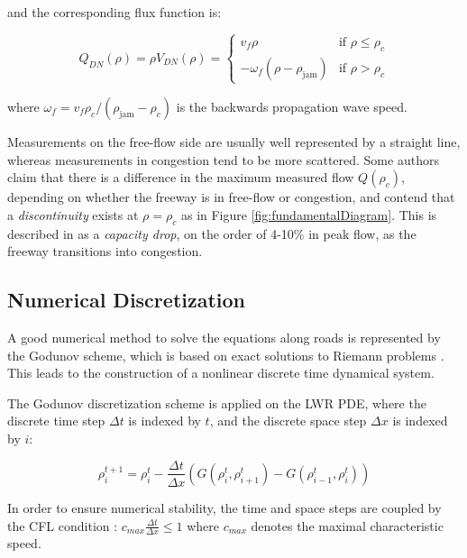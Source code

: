 \documentclass[11pt]{article}
\numberwithin{equation}{section}
\numberwithin{figure}{section}
\numberwithin{table}{section}
\begin{document}
\noindent and the corresponding flux function is:

\begin{equation}\label{eq:dnFlux}
Q_{DN}(\rho) = \rho V_{DN}(\rho) = \begin{cases}
v_{f} \rho & \text{if } \rho \leq \rho_{c} \\
-\omega_{f} \left( \rho - \rho_{\text{jam}} \right) & \text{if } \rho > \rho_{c}
\end{cases}
\end{equation}

\noindent where $\omega_{f}=v_{f}\rho_{c}/(\rho_{\text{jam}}-\rho_{c})$ is the backwards propagation wave speed.

Measurements on the free-flow side are usually well represented by a straight line, whereas measurements in congestion tend to be more scattered. Some authors claim that there is a difference in the maximum measured flow $Q(\rho_{c})$, depending on whether the freeway is in free-flow or congestion, and contend that a \textit{discontinuity} exists at $\rho=\rho_{c}$ as in Figure \ref{fig:fundamentalDiagram}. This is described in \cite{Agyemang-Duah1991,Cassidy1999,Hall1991} as a \textit{capacity drop}, on the order of 4-10\% in peak flow, as the freeway transitions into congestion.

\subsection{Numerical Discretization}

A good numerical method to solve the equations along roads is represented by the Godunov scheme, which is based on exact solutions to Riemann problems \cite{Godlewski1996,Godunov1959}. This leads to the construction of a nonlinear discrete time dynamical system.

The Godunov discretization scheme is applied on the LWR PDE, where the discrete time step $\Delta t$ is indexed by $t$, and the discrete space step $\Delta x$ is indexed by $i$:

\begin{equation} \label{eq:rhoGodunov}
\rho^{t+1}_{i} = \rho^{t}_{i} - \frac{\Delta t}{\Delta x}\left(G(\rho^{t}_{i},\rho^{t}_{i+1})-G(\rho^{t}_{i-1},\rho^{t}_{i})\right)
\end{equation}

\noindent In order to ensure numerical stability, the time and space steps are coupled by the CFL condition \cite{LeVeque1992}: $c_{max}\frac{\Delta t}{\Delta x} \leq 1$ where $c_{max}$ denotes the maximal characteristic speed.
\end{document}
